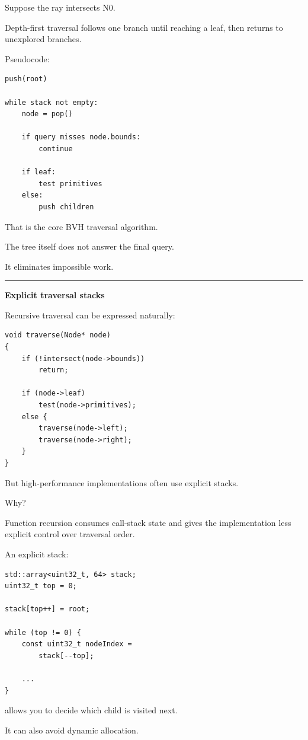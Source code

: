 Suppose the ray intersects N0.

Depth-first traversal follows one branch until reaching a leaf, then returns to unexplored branches.

Pseudocode:

\begin{verbatim}
push(root)

while stack not empty:
    node = pop()

    if query misses node.bounds:
        continue

    if leaf:
        test primitives
    else:
        push children
\end{verbatim}

That is the core BVH traversal algorithm.

The tree itself does not answer the final query.

It eliminates impossible work.

\begin{center}\rule{0.5\linewidth}{0.5pt}\end{center}

\textbf{Explicit traversal stacks}

Recursive traversal can be expressed naturally:

\begin{verbatim}
void traverse(Node* node)
{
    if (!intersect(node->bounds))
        return;

    if (node->leaf)
        test(node->primitives);
    else {
        traverse(node->left);
        traverse(node->right);
    }
}
\end{verbatim}

But high-performance implementations often use explicit stacks.

Why?

Function recursion consumes call-stack state and gives the implementation less explicit control over traversal order.

An explicit stack:

\begin{verbatim}
std::array<uint32_t, 64> stack;
uint32_t top = 0;

stack[top++] = root;

while (top != 0) {
    const uint32_t nodeIndex =
        stack[--top];

    ...
}
\end{verbatim}

allows you to decide which child is visited next.

It can also avoid dynamic allocation.


